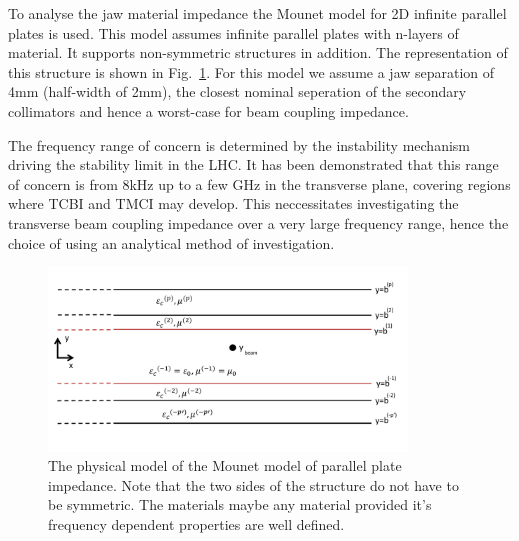 To analyse the jaw material impedance the Mounet model \cite{Mounet:Flat} for 2D infinite parallel plates is used. This model assumes infinite parallel plates with n-layers of material. It supports non-symmetric structures in addition. The representation of this structure is shown in Fig.~\ref{fig:mounet-model}. For this model we assume a jaw separation of 4mm (half-width of 2mm), the closest nominal seperation of the secondary collimators and hence a worst-case for beam coupling impedance.

The frequency range of concern is determined by the instability mechanism driving the stability limit in the LHC. It has been demonstrated that this range of concern is from 8kHz up to a few GHz \cite{Metral:phase2Imp} in the transverse plane, covering regions where TCBI and TMCI may develop. This neccessitates investigating the transverse beam coupling impedance over a very large frequency range, hence the choice of using an analytical method of investigation.

\begin{figure}
\begin{center}
\includegraphics[width=0.85\textwidth]{LHC_Collimation_Upgrades/figures/mounet-model.pdf}
\end{center}
\caption{The physical model of the Mounet model of parallel plate impedance. Note that the two sides of the structure do not have to be symmetric. The materials maybe any material provided it's frequency dependent properties are well defined.}
\label{fig:mounet-model}
\end{figure}

